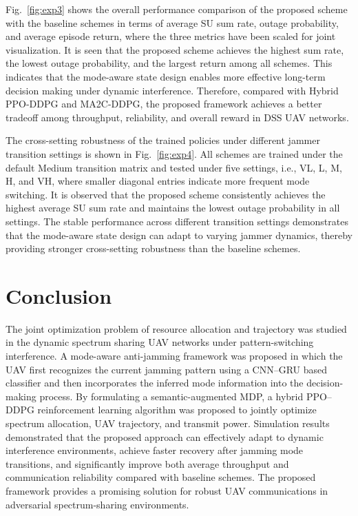 \documentclass[conference]{IEEEtran}
\begin{document}
Fig.~\ref{fig:exp3} shows the overall performance comparison of the proposed scheme with the baseline schemes in terms of average SU sum rate, outage probability, and average episode return, 
where the three metrics have been scaled for joint visualization.
It is seen that the proposed scheme achieves the highest sum rate, the lowest outage probability, and the largest return among all schemes. 
This indicates that the mode-aware state design enables more effective long-term decision making under dynamic interference. 
Therefore, compared with Hybrid PPO-DDPG and MA2C-DDPG, the proposed framework achieves a better tradeoff among throughput, reliability, and overall reward in DSS UAV networks.

The cross-setting robustness of the trained policies under different jammer transition settings is shown in Fig.~\ref{fig:exp4}.
All schemes are trained under the default Medium transition matrix and tested under five settings, i.e., VL, L, M, H, and VH, where smaller diagonal entries indicate more frequent mode switching. 
It is observed that the proposed scheme consistently achieves the highest average SU sum rate and maintains the lowest outage probability in all settings. 
The stable performance across different transition settings demonstrates that the mode-aware state design can adapt to varying jammer dynamics, thereby providing stronger cross-setting robustness than the baseline schemes.

\section{Conclusion}
The joint optimization problem of resource allocation and trajectory was studied in the dynamic spectrum sharing UAV networks under pattern-switching interference. 
A mode-aware anti-jamming framework was proposed in which the UAV first recognizes the current jamming pattern 
using a CNN–GRU based classifier and then incorporates the inferred mode information
into the decision-making process. By formulating a semantic-augmented MDP, 
a hybrid PPO–DDPG reinforcement learning algorithm was proposed to jointly optimize spectrum allocation, 
UAV trajectory, and transmit power. 
Simulation results demonstrated that the proposed approach can effectively adapt to dynamic interference 
environments, achieve faster recovery after jamming mode transitions, 
and significantly improve both average throughput and communication reliability compared with baseline schemes. 
The proposed framework provides a promising solution for robust UAV communications in adversarial spectrum-sharing environments.

 
      
\end{document}
